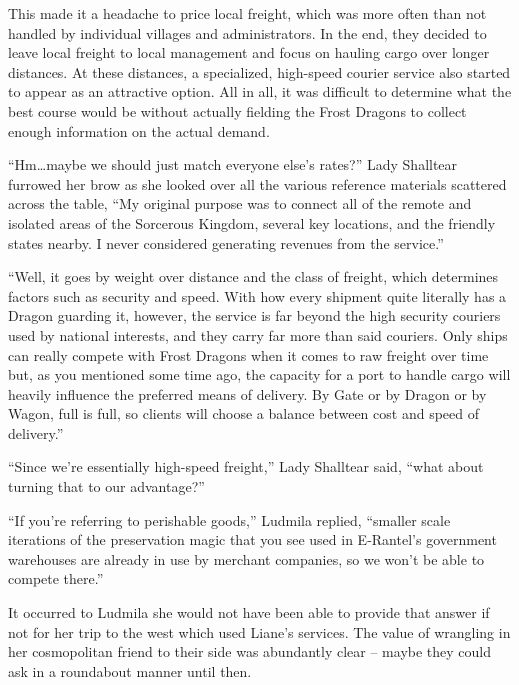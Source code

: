  

This made it a headache to price local freight, which was more often than not handled by individual villages and administrators. In the end, they decided to leave local freight to local management and focus on hauling cargo over longer distances. At these distances, a specialized, high-speed courier service also started to appear as an attractive option. All in all, it was difficult to determine what the best course would be without actually fielding the Frost Dragons to collect enough information on the actual demand.

 

“Hm…maybe we should just match everyone else’s rates?” Lady Shalltear furrowed her brow as she looked over all the various reference materials scattered across the table, “My original purpose was to connect all of the remote and isolated areas of the Sorcerous Kingdom, several key locations, and the friendly states nearby. I never considered generating revenues from the service.”

 

“Well, it goes by weight over distance and the class of freight, which determines factors such as security and speed. With how every shipment quite literally has a Dragon guarding it, however, the service is far beyond the high security couriers used by national interests, and they carry far more than said couriers. Only ships can really compete with Frost Dragons when it comes to raw freight over time but, as you mentioned some time ago, the capacity for a port to handle cargo will heavily influence the preferred means of delivery. By Gate or by Dragon or by Wagon, full is full, so clients will choose a balance between cost and speed of delivery.”

 

“Since we’re essentially high-speed freight,” Lady Shalltear said, “what about turning that to our advantage?”

 

“If you’re referring to perishable goods,” Ludmila replied, “smaller scale iterations of the preservation magic that you see used in E-Rantel’s government warehouses are already in use by merchant companies, so we won’t be able to compete there.”

 

It occurred to Ludmila she would not have been able to provide that answer if not for her trip to the west which used Liane’s services. The value of wrangling in her cosmopolitan friend to their side was abundantly clear – maybe they could ask in a roundabout manner until then.

